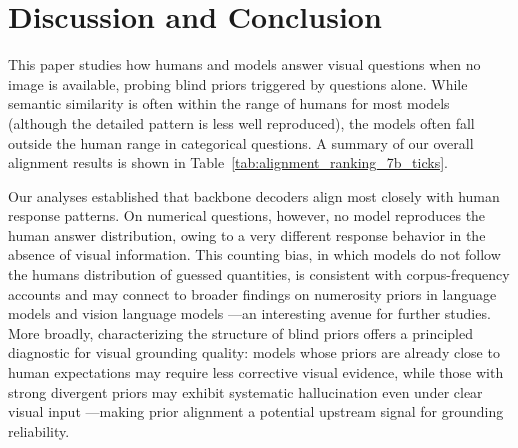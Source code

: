 \documentclass[letterpaper]{article}
\begin{document}
\section{Discussion and Conclusion}
\label{sec:discussion}
This paper studies how humans and models answer visual questions when no image is available, probing blind priors triggered by questions alone. 
While semantic similarity is often within the range of humans for most models (although the detailed pattern is less well reproduced), the models often fall outside the human range in categorical questions. A summary of our overall alignment results is shown in Table~\ref{tab:alignment_ranking_7b_ticks}. %

Our analyses established that backbone decoders align most closely with human response patterns. On numerical questions, however, no model reproduces the human answer distribution, owing to a very different response behavior in the absence of visual information. 
This counting bias, in which models do not follow the humans distribution of guessed quantities, is consistent with corpus-frequency accounts \citep{mccoy2024embers} and may connect to broader findings on numerosity priors in language models \citep{zhang2020language} and vision language models \citep{paiss2023teaching}---an interesting avenue for further studies.
More broadly, characterizing the structure of blind priors offers a principled diagnostic for visual grounding quality: models whose priors are already close to human expectations may require less corrective visual evidence, while those with strong divergent priors may exhibit systematic hallucination even under clear visual input \citep{rohrbach2018object, li2023evaluating, huang2024opera, ji2023survey}---making prior alignment a potential upstream signal for grounding reliability.
\end{document}
